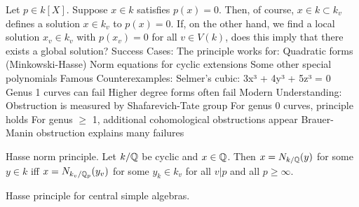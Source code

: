 \begin{outline}
\0 Let $p\in k[X]$. Suppose $x\in k$ satisfies $p(x)=0$. Then, of course, $x\in k \subset k_v$ defines a solution $x\in k_v$ to $p(x)=0$. If, on the other hand, we find a local solution $x_v \in k_v$ with $p(x_v)=0$ for all $v\in V(k)$, does this imply that there exists a global solution?
    \1 Success Cases: The principle works for:
        \2 Quadratic forms (Minkowski-Hasse)
        \2 Norm equations for cyclic extensions
        \2 Some other special polynomials
    \1 Famous Counterexamples:
        \2 Selmer's cubic: 3x³ + 4y³ + 5z³ = 0
        \2 Genus 1 curves can fail
        \2 Higher degree forms often fail
    \1 Modern Understanding:
        \2 Obstruction is measured by Shafarevich-Tate group
        \2 For genus 0 curves, principle holds
        \2 For genus $\geq$ 1, additional cohomological obstructions appear
        \2 Brauer-Manin obstruction explains many failures
\0 \begin{theorem}
    Hasse norm principle. Let $k/\mathbb{Q}$ be cyclic and $x\in \mathbb{Q}$. Then $x=N_{k/\mathbb{Q}}(y)$ for some $y\in k$ iff $x=N_{k_v/\mathbb{Q}_p}(y_v)$ for some $y_k\in k_v$ for all $v|p$ and all $p\geq \infty$. 
\0 \begin{theorem}
    Hasse principle for central simple algebras. 
\end{theorem}
\end{theorem}
\end{outline}   


  